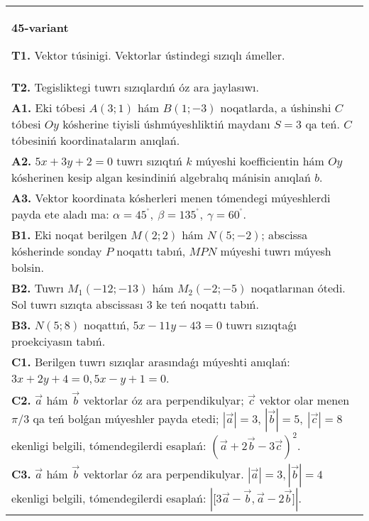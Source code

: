 \documentclass{article}
\begin{document}
\begin{tabular}{m{17cm}}
\textbf{45-variant}

\textbf{T1.} 
Vektor túsinigi. Vektorlar ústindegi sızıqlı ámeller.
 \\
\textbf{T2.} 
Tegisliktegi tuwrı sızıqlardıń óz ara jaylasıwı.
 \\
\textbf{A1.} 
Eki tóbesi $A (3;1) $ hám $B (1;-3) $ noqatlarda, a
úshinshi $C$ tóbesi $Oy$ kósherine tiyisli úshmúyeshliktiń
maydanı $S=3$ qa teń. $C$ tóbesiniń koordinataların anıqlań.
 \\
\textbf{A2.} 
$5x+3y+2=0$ tuwrı sızıqtıń $k$ múyeshi
koefficientin hám $Oy$ kósherinen kesip algan kesindiniń algebralıq
mánisin anıqlań $b$.
 \\
\textbf{A3.} 
Vektor koordinata kósherleri menen tómendegi múyeshlerdi payda ete aladı ma:
$\alpha = 45^{{^\circ}},\ \beta = 135^{{^\circ}},\ \gamma = 60^{{^\circ}}$.
 \\
\textbf{B1.} 
Eki noqat berilgen \(M (2;2) \) hám \(N (5;-2) \); abscissa kósherinde sonday $P$ noqattı tabıń, $MPN$ múyeshi tuwrı múyesh bolsin.
 \\
\textbf{B2.} 
Tuwrı \(M_{1} (-12;-13) \) hám \(M_{2} (-2;-5) \)
noqatlarınan ótedi. Sol tuwrı sızıqta abscissası 3 ke teń noqattı tabıń.
 \\
\textbf{B3.} 
\(N (5;8) \) noqattıń, \(5x-11y-43=0\) tuwrı sızıqtaǵı
proekciyasın tabıń.
 \\
\textbf{C1.} 
Berilgen tuwrı sızıqlar arasındaǵı múyeshti anıqlań: $3x+2y+4=0, 5x-y+1=0$.
 \\
\textbf{C2.} 
$\vec{a}$ hám $\vec{b}$ vektorlar óz ara perpendikulyar; $\vec{c}$ vektor olar menen $\pi/3$ qa teń bolǵan múyeshler payda etedi; $|\vec{a}| = 3$, $|\vec{b}| = 5,\ |\vec{c}| = 8$ ekenligi belgili, tómendegilerdi esaplań:
$ (\vec{a} + 2\vec{b} - 3\vec{c}) ^{2}$.
 \\
\textbf{C3.} 
$\vec{a}$ hám $\vec{b}$ vektorlar óz ara perpendikulyar. $|\vec{a}| = 3,|\vec{b}| = 4$ ekenligi belgili, tómendegilerdi esaplań:
$|\lbrack 3\vec{a} - \vec{b},\vec{a}-2\vec{b}\rbrack|$.
 \\

\end{tabular}
\vspace{1cm}
\end{document}
